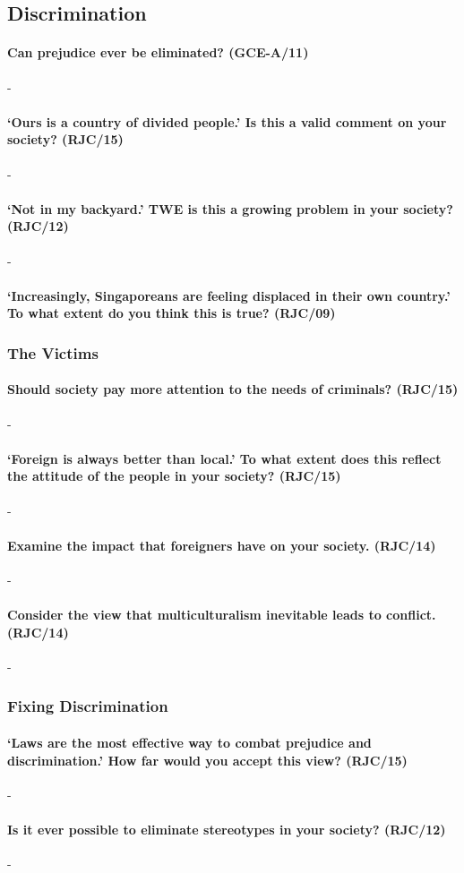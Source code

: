 \documentclass[../../main]{subfiles}
\begin{document}
\subsection{Discrimination}

\paragraph{Can prejudice ever be eliminated? (GCE-A/11)}-

\paragraph{`Ours is a country of divided people.' Is this a valid comment on your society? (RJC/15)}-

\paragraph{`Not in my backyard.' TWE is this a growing problem in your society? (RJC/12)}-

\paragraph{`Increasingly, Singaporeans are feeling displaced in their own country.' To what extent do you think this is true? (RJC/09)}

\subsubsection{The Victims}

\paragraph{Should society pay more attention to the needs of criminals? (RJC/15)}-

\paragraph{`Foreign is always better than local.' To what extent does this reflect the attitude of the people in your society? (RJC/15)}-

\paragraph{Examine the impact that foreigners have on your society. (RJC/14)}-

\paragraph{Consider the view that multiculturalism inevitable leads to conflict. (RJC/14)}-

\subsubsection{Fixing Discrimination}

\paragraph{`Laws are the most effective way to combat prejudice and discrimination.' How far would you accept this view? (RJC/15)}-

\paragraph{Is it ever possible to eliminate stereotypes in your society? (RJC/12)}-
\end{document}
